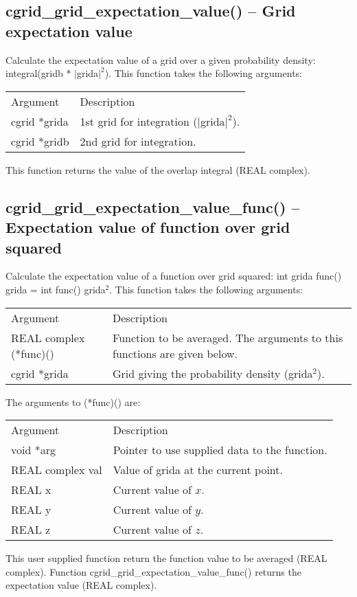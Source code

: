 \documentclass[12pt,letterpaper]{report}
\begin{document}
\subsection{cgrid\_grid\_expectation\_value() -- Grid expectation value}

Calculate the expectation value of a grid over a given probability density: integral(gridb * $|$grida$|^2$). This function takes the following arguments:
\begin{longtable}{p{} p{}}
Argument & Description\\
\cline{1-2}
cgrid *grida & 1st grid for integration ($|$grida$|^2$).\\
cgrid *gridb & 2nd grid for integration.\\
\end{longtable}
\noindent
This function returns the value of the overlap integral (REAL complex).

\subsection{cgrid\_grid\_expectation\_value\_func() -- Expectation value of function over grid squared}

Calculate the expectation value of a function over grid squared: int grida func() grida = int func() grida$^2$. This function takes the following arguments:
\begin{longtable}{p{} p{}}
Argument & Description\\
\cline{1-2}
REAL complex (*func)() & Function to be averaged. The arguments to this functions are given below.\\
cgrid *grida & Grid giving the probability density (grida$^2$).\\
\end{longtable}
\noindent
The arguments to (*func)() are:
\begin{longtable}{p{} p{}}
Argument & Description\\
\cline{1-2}
void *arg & Pointer to use supplied data to the function.\\
REAL complex val & Value of grida at the current point.\\
REAL x & Current value of $x$.\\
REAL y & Current value of $y$.\\
REAL z & Current value of $z$.\\
\end{longtable}
\noindent
This user supplied function return the function value to be averaged (REAL complex). Function cgrid\_grid\_expectation\_value\_func() returns the expectation value (REAL complex).
\end{document}
